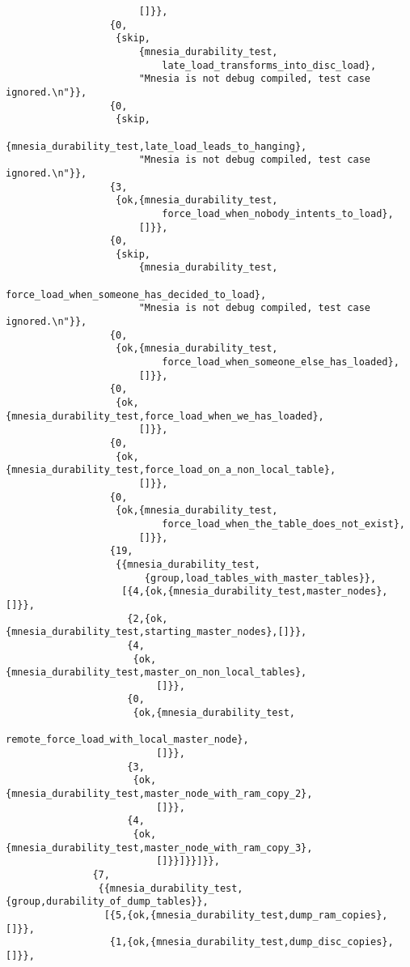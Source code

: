 \begin{verbatim}
                       []}},
                  {0,
                   {skip,
                       {mnesia_durability_test,
                           late_load_transforms_into_disc_load},
                       "Mnesia is not debug compiled, test case ignored.\n"}},
                  {0,
                   {skip,
                       {mnesia_durability_test,late_load_leads_to_hanging},
                       "Mnesia is not debug compiled, test case ignored.\n"}},
                  {3,
                   {ok,{mnesia_durability_test,
                           force_load_when_nobody_intents_to_load},
                       []}},
                  {0,
                   {skip,
                       {mnesia_durability_test,
                           force_load_when_someone_has_decided_to_load},
                       "Mnesia is not debug compiled, test case ignored.\n"}},
                  {0,
                   {ok,{mnesia_durability_test,
                           force_load_when_someone_else_has_loaded},
                       []}},
                  {0,
                   {ok,{mnesia_durability_test,force_load_when_we_has_loaded},
                       []}},
                  {0,
                   {ok,{mnesia_durability_test,force_load_on_a_non_local_table},
                       []}},
                  {0,
                   {ok,{mnesia_durability_test,
                           force_load_when_the_table_does_not_exist},
                       []}},
                  {19,
                   {{mnesia_durability_test,
                        {group,load_tables_with_master_tables}},
                    [{4,{ok,{mnesia_durability_test,master_nodes},[]}},
                     {2,{ok,{mnesia_durability_test,starting_master_nodes},[]}},
                     {4,
                      {ok,{mnesia_durability_test,master_on_non_local_tables},
                          []}},
                     {0,
                      {ok,{mnesia_durability_test,
                              remote_force_load_with_local_master_node},
                          []}},
                     {3,
                      {ok,{mnesia_durability_test,master_node_with_ram_copy_2},
                          []}},
                     {4,
                      {ok,{mnesia_durability_test,master_node_with_ram_copy_3},
                          []}}]}}]}},
               {7,
                {{mnesia_durability_test,{group,durability_of_dump_tables}},
                 [{5,{ok,{mnesia_durability_test,dump_ram_copies},[]}},
                  {1,{ok,{mnesia_durability_test,dump_disc_copies},[]}},

\end{verbatim}
